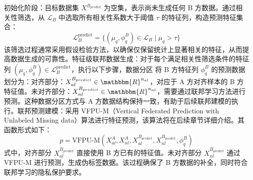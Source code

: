 初始化阶段：目标数据集 $X^{B_{predict}}$ 为空集，表示尚未生成任何 B 方数据。通过相关性筛选，从 $\mathcal{L}_B$ 中选取所有相关性系数大于阈值 $\tau$ 的特征列，构造预测特征集合：
\begin{equation}
	\mathcal{L}_B^{\text{predict}} = \{(\mu_q, \phi^B_q) \in \mathcal{L}_B \mid \mu_q > \tau\}
\end{equation}
该筛选过程通常采用假设检验方法，以确保仅保留统计上显著相关的特征，从而提高数据生成的可靠性。特征级联邦数据生成：对于每个满足相关性筛选条件的特征列 $(\mu_q, \phi^B_q) \in \mathcal{L}_B^{\text{predict}}$，执行以下步骤，数据分区  将 B 方特征列 $\phi^B_q$ 的预测数据划分为：对齐部分：$X_{al}^{B_{predict}} \in \mathbbm{R}^{n_{al}}$，对应于 A 方对齐样本的 B 方特征值。未对齐部分：$X_{nl}^{B_{predict}} \in \mathbbm{R}^{n_{nl}}$，需要通过联邦学习方法进行预测。这种数据分区方式与 A 方数据结构保持一致，有助于后续联邦建模的执行。联邦预测建模：采用 VFPU-M（Vertical Federated Prediction with Unlabeled Missing data）算法进行特征预测，该算法将在后续章节详细介绍。其函数形式如下：
\begin{equation}
	p = \text{VFPU-M}(X_{al}^A, X_{nl}^A, X_{al}^{B_{predict}}, X_{nl}^{B_{predict}}, \phi^B_q)
\end{equation}
式中，对齐部分 $X_{al}^{B_{predict}}$ 直接使用 B 方已有的特征值。未对齐部分 $X_{nl}^{B_{predict}}$ 通过 VFPU-M 进行预测，生成伪标签数据。该过程确保了 B 方数据的补全，同时符合联邦学习的隐私保护要求。

